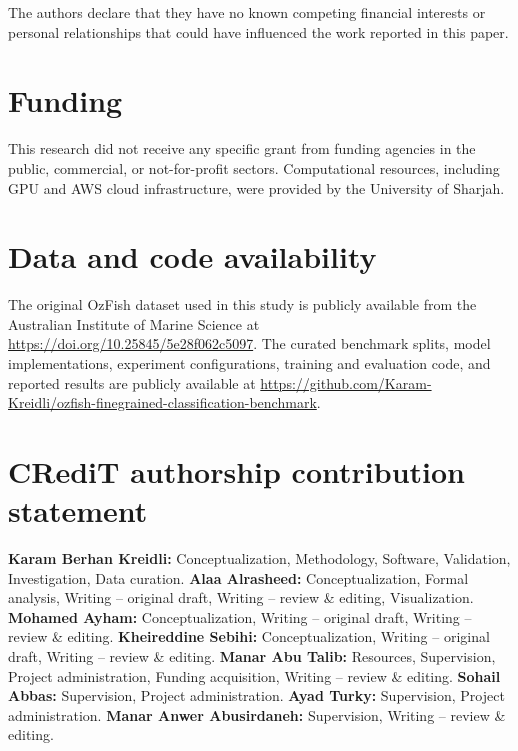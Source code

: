 \documentclass[preprint,12pt]{elsarticle}
\begin{document}
The authors declare that they have no known competing financial
interests or personal relationships that could have influenced the work
reported in this paper.

\section*{Funding}

This research did not receive any specific grant from funding agencies
in the public, commercial, or not-for-profit sectors. Computational
resources, including GPU and AWS cloud infrastructure, were provided by
the University of Sharjah.

\section*{Data and code availability}

The original OzFish dataset used in this study is publicly available
from the Australian Institute of Marine Science at
\url{https://doi.org/10.25845/5e28f062c5097}. The curated benchmark
splits, model implementations, experiment configurations, training and
evaluation code, and reported results are publicly available at
\url{https://github.com/Karam-Kreidli/ozfish-finegrained-classification-benchmark}.

\section*{CRediT authorship contribution statement}

\textbf{Karam Berhan Kreidli:} Conceptualization, Methodology, Software,
Validation, Investigation, Data curation.
\textbf{Alaa Alrasheed:} Conceptualization, Formal analysis,
Writing -- original draft, Writing -- review \& editing, Visualization.
\textbf{Mohamed Ayham:} Conceptualization, Writing -- original draft,
Writing -- review \& editing.
\textbf{Kheireddine Sebihi:} Conceptualization, Writing -- original draft,
Writing -- review \& editing.
\textbf{Manar Abu Talib:} Resources, Supervision, Project administration,
Funding acquisition, Writing -- review \& editing.
\textbf{Sohail Abbas:} Supervision, Project administration.
\textbf{Ayad Turky:} Supervision, Project administration.
\textbf{Manar Anwer Abusirdaneh:} Supervision, Writing -- review \& editing.



\end{document}
